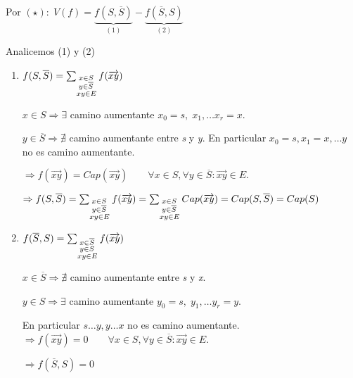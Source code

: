 \documentclass[12pt,a4paper]{report}
\begin{document}
				Por $(\star): \; V(f) =  \underbrace{f(S, \overline{S})}_{(1)} - \underbrace{f(\overline{S}, S)}_{(2)}$
				
				\vspace{2mm}
				Analicemos (1) y (2)
			\begin{enumerate}[(1)]
				\item $f(S, \overline{S}) = \sum_{\begin{subarray}{l} \; x \in S\\
\; y \in \overline{S} \\ xy \in E\end{subarray}} f(\overrightarrow{xy}) $

				$x \in S \Rightarrow \exists$ camino aumentante $ x_{0} = s, \; x_{1}, \dotsc x_{r} = x$.

				$y \in \overline{S} \Rightarrow \nexists$ camino aumentante entre \textit{s} y \textit{y}. En particular $x_{0} = s, x_{1}= x, \dotsc y$ no es camino aumentante.
				
				\vspace{3mm}
				$\Rightarrow f(\overrightarrow{xy}) = Cap(\overrightarrow{xy}) \qquad \forall x \in S, \forall y \in \overline{S} : \overrightarrow{xy} \in E.$ 
				
				\vspace{3mm}
				$\Rightarrow f(S, \overline{S}) = \sum_{\begin{subarray}{l} \; x \in S\\  \; y \in \overline{S} \\ xy \in E\end{subarray}} f(\overrightarrow{xy}) = \sum_{\begin{subarray}{l} \; x \in S\\  \; y \in \overline{S} \\ xy \in E\end{subarray}} Cap(\overrightarrow{xy}) = Cap(S, \overline{S}) = Cap(S)$				

				\item $f(\overline{S}, S) = \sum_{\begin{subarray}{l} \; x \in \overline{S}\\
\; y \in S \\ xy \in E\end{subarray}} f(\overrightarrow{xy}) $

				$x \in \overline{S} \Rightarrow \nexists$ camino aumentante entre \textit{s} y \textit{x}.

				$y \in S \Rightarrow \exists$ camino aumentante $ y_{0} = s, \; y_{1}, \dotsc y_{r} = y$.
				
				En particular $s \dotsc y, y \dotsc x$ no es camino aumentante. $\Rightarrow f(\overrightarrow{xy}) = 0 \qquad \forall x \in S, \forall y \in \overline{S} : \overrightarrow{xy} \in E$.
				
				\vspace{3mm}
				$\Rightarrow f(\overline{S}, S) = 0$
			\end{enumerate}
			
\end{document}
